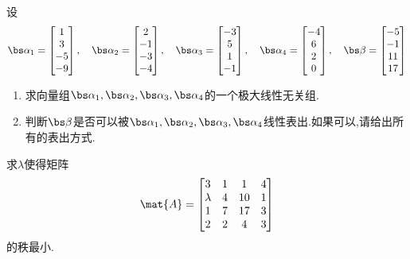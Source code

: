 \documentclass{ctexart}
\begin{document}
\begin{homework}[2(18')]
    设
    \[\bs\alpha_1=\begin{bmatrix}
        1\\3\\-5\\-9
    \end{bmatrix},\quad\bs\alpha_2=\begin{bmatrix}
        2\\-1\\-3\\-4
    \end{bmatrix},\quad\bs\alpha_3=\begin{bmatrix}
        -3\\5\\1\\-1
    \end{bmatrix},\quad\bs\alpha_4=\begin{bmatrix}
        -4\\6\\2\\0
    \end{bmatrix},\quad\bs\beta=\begin{bmatrix}
        -5\\-1\\11\\17
    \end{bmatrix}\]
    \begin{enumerate}[label=\tbf{(\arabic*)},topsep=0pt,parsep=0pt,itemsep=0pt,partopsep=0pt]
        \item 求向量组$\bs\alpha_1,\bs\alpha_2,\bs\alpha_3,\bs\alpha_4$的一个极大线性无关组.
        \item 判断$\bs\beta$是否可以被$\bs\alpha_1,\bs\alpha_2,\bs\alpha_3,\bs\alpha_4$线性表出.如果可以,请给出所有的表出方式.
    \end{enumerate}
\end{homework}
\begin{homework}[3(10')]
    求$\lambda$使得矩阵
    \[\mat{A}=\begin{bmatrix}
        3&1&1&4\\
        \lambda&4&10&1\\
        1&7&17&3\\
        2&2&4&3
    \end{bmatrix}\]
    的秩最小.
\end{homework}
\end{document}
